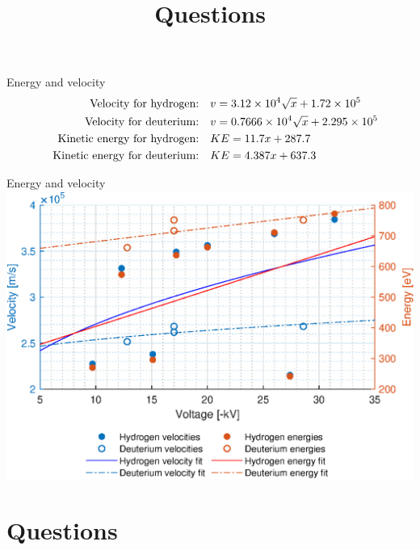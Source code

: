 \documentclass[hyperref={colorlinks=true,urlcolor=blue,linkcolor=.},aspectratio=1610,mathserif]{beamer}
\begin{document}
\begin{frame}{Energy and velocity}
	\begin{align}
		\qq{Velocity for hydrogen:}        & v = 3.12\times10^4 \sqrt{x}+1.72\times10^5   \nonumber \\
		\qq{Velocity for deuterium:}       & v = 0.7666\times10^4\sqrt{x}+2.295\times10^5 \nonumber \\
		\qq{Kinetic energy for hydrogen:}  & KE = 11.7x+287.7                             \nonumber \\
		\qq{Kinetic energy for deuterium:} & KE = 4.387x+637.3 \nonumber
	\end{align}
\end{frame}

\begin{frame}{Energy and velocity}
	\centering
	\includegraphics[width=\textwidth]{MatlabFigures/Asign3/KineticVelo.eps}
\end{frame}

\section*{Questions}
\title{Questions}
\subtitle{}
\begin{frame}
	\titlepage
\end{frame}
\end{document}
